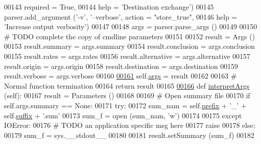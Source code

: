 \begin{DoxyCode}
{00143                              required = \textcolor{keyword}{True},
00144                              help = \textcolor{stringliteral}{'Destination exchange'})
00145         parser.add\_argument (\textcolor{stringliteral}{'-v'}, \textcolor{stringliteral}{'--verbose'}, action = \textcolor{stringliteral}{"store\_true"},
00146                              help = \textcolor{stringliteral}{'Increase output verbosity'})
00147                              
00148         args = parser.parse\_args ()
00149         
00150         \textcolor{comment}{# TODO complete the copy of cmdline parameters}
00151         
00152         result = Args ()
00153         result.summary     = args.summary 
00154         result.conclusion  = args.conclusion 
00155         result.rates       = args.rates 
00156         result.alternative = args.alternative 
00157         result.origin      = args.origin 
00158         result.destination = args.destination 
00159         result.verbose     = args.verbose
00160         
\hypertarget{e2e_8py_source.tex_l00161}{}\hyperlink{classe2e_1_1_application_abade6fc2e2c04ddd7e48137a2a7721bd}{00161}         self.\hyperlink{classe2e_1_1_application_abade6fc2e2c04ddd7e48137a2a7721bd}{args} = result
00162         
00163         \textcolor{comment}{# Normal function termination}
00164         \textcolor{keywordflow}{return} result
00165         
\hypertarget{e2e_8py_source.tex_l00166}{}\hyperlink{classe2e_1_1_application_ae7b9559aa388f8178300fb4d7a9f9257}{00166}     \textcolor{keyword}{def }\hyperlink{classe2e_1_1_application_ae7b9559aa388f8178300fb4d7a9f9257}{interpretArgs} (self):
00167         result = Parameters ()
00168         
00169         \textcolor{comment}{# Open summary file}
00170         \textcolor{keywordflow}{if} self.args.summary == \textcolor{keywordtype}{None}:
00171             \textcolor{keywordflow}{try}:
00172                 sum\_nam =  self.\hyperlink{classe2e_1_1_application_a027ff25e5409ae17584978a09fc2611a}{prefix} + \textcolor{stringliteral}{'\_'} + self.\hyperlink{classe2e_1_1_application_a4d824ad36b051d2d629edb314385df0d}{suffix} + \textcolor{stringliteral}{'.sum'}
00173                 sum\_f = open (sum\_nam, \textcolor{stringliteral}{'w'})
00174                 
00175             \textcolor{keywordflow}{except} IOError:
00176                 \textcolor{comment}{# TODO an application specific msg here}
00177                 \textcolor{keywordflow}{raise}
00178         \textcolor{keywordflow}{else}:
00179             sum\_f = sys.\_\_stdout\_\_
00180             
00181         result.setSummary (sum\_f)
00182             
}
\end{DoxyCode}

